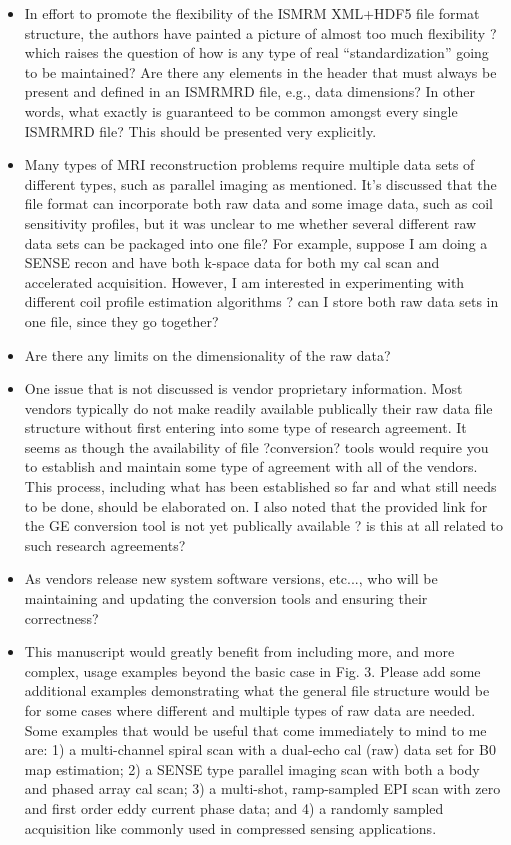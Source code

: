 \documentclass[12pt, draft]{article}
\makeatletter
\def\namedlabel#1#2{\begingroup#2\def\@currentlabel{#2}\phantomsection\label{#1}\endgroup}
\newcommand{\question}[1]{\item[\namedlabel{q#1}{#1}]}
\makeatother
\begin{document}
{\begin{itemize}
\question{R1.2} In effort to promote the flexibility of the ISMRM XML+HDF5 file format structure, the authors have painted a picture of almost too much flexibility ? which raises the question of how is any type of real ``standardization'' going to be maintained? Are there any elements in the header that must always be present and defined in an ISMRMRD file, e.g., data dimensions? In other words, what exactly is guaranteed to be common amongst every single ISMRMRD file? This should be presented very explicitly.

\question{R1.3} Many types of MRI reconstruction problems require multiple data sets of different types, such as parallel imaging as mentioned. It's discussed that the file format can incorporate both raw data and some image data, such as coil sensitivity profiles, but it was unclear to me whether several different raw data sets can be packaged into one file? For example, suppose I am doing a SENSE recon and have both k-space data for both my cal scan and accelerated acquisition. However, I am interested in experimenting with different coil profile estimation algorithms ? can I store both raw data sets in one file, since they go together?

\question{R1.4} Are there any limits on the dimensionality of the raw data?

\question{R1.5} One issue that is not discussed is vendor proprietary information. Most vendors typically do not make readily available publically their raw data file structure without first entering into some type of research agreement. It seems as though the availability of file ?conversion? tools would require you to establish and maintain some type of agreement with all of the vendors. This process, including what has been established so far and what still needs to be done, should be elaborated on. I also noted that the provided link for the GE conversion tool is not yet publically available ? is this at all related to such research agreements?

\question{R1.6} As vendors release new system software versions, etc..., who will be maintaining and updating the conversion tools and ensuring their correctness?

\question{R1.7} This manuscript would greatly benefit from including more, and more complex, usage examples beyond the basic case in Fig. 3. Please add some additional examples demonstrating what the general file structure would be for some cases where different and multiple types of raw data are needed. Some examples that would be useful that come immediately to mind to me are: 1) a multi-channel spiral scan with a dual-echo cal (raw) data set for B0 map estimation; 2) a SENSE type parallel imaging scan with both a body and phased array cal scan; 3) a multi-shot, ramp-sampled EPI scan with zero and first order eddy current phase data; and 4) a randomly sampled acquisition like commonly used in compressed sensing applications.


\end{itemize}}
\end{document}

